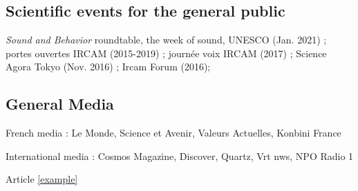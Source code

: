 \documentclass[a4paper, 11pt]{article}
\begin{document}
\subsection*{Scientific events for the general public}
\begin{description}
\item  \emph{Sound and Behavior} roundtable, the week of sound, UNESCO (Jan. 2021)  ; portes ouvertes IRCAM (2015-2019) ; journée voix IRCAM (2017) ; Science Agora Tokyo (Nov. 2016)  ; Ircam Forum (2016);
\end{description}

\subsection*{General Media}
\begin{description}
\item French media : Le Monde, Science et Avenir, Valeurs Actuelles, Konbini France
\item International media  : Cosmos Magazine, Discover, Quartz, Vrt nws, NPO Radio 1
\end{description}
Article {\footnotesize \href{https://qz.com/1342753/smiles-have-a-sound-and-its-contagious-a-study-says/}{[example]}}
\end{document}
